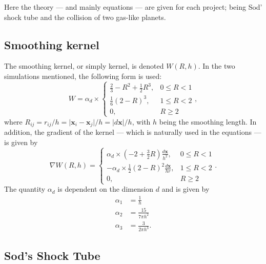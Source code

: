 \documentclass[12pt]{article}
\begin{document}
Here the theory --- and mainly equations --- are given for each project; being Sod' shock tube and the collision of two gas-like planets. 

\subsection{Smoothing kernel}

The smoothing kernel, or simply kernel, is denoted $W(R,h)$. In the two simulations mentioned, the following form is used:
\begin{equation}
	W = \alpha_d\times
	\begin{cases}
		\frac{2}{3} - R^2 + \frac{1}{2}R^3, & 0\leq R < 1\\
		\frac{1}{6}(2-R)^3, & 1 \leq R < 2\\
		0, & R\geq 2
	\end{cases},
\end{equation}
where $R_{ij} = r_{ij}/h = \vert\mathbf{x}_i - \mathbf{x}_j\vert/h = \vert d\mathbf{x}\vert/h$, with $h$ being the smoothing length. In addition, the gradient of the kernel --- which is naturally used in the equations --- is given by 
\begin{equation}
	\nabla W(R,h) = 
	\begin{cases}
		\alpha_d\times \left(-2 + \frac{3}{2}R\right)\frac{d\mathbf{x}}{h^2}, & 0 \leq R < 1\\
		-\alpha_d\times \frac{1}{2}(2-R)^2\frac{d\mathbf{x}}{hr}, & 1\leq R < 2\\
		0, & R\geq 2
	\end{cases}.
\end{equation}
The quantity $\alpha_d$ is dependent on the dimension $d$ and is given by 
\begin{align}
	\alpha_1 &= \frac{1}{h}\\
	\alpha_2 &= \frac{15}{7\pi h^2}\\
	\alpha_3 &= \frac{3}{2\pi h^3}.
\end{align}

\subsection{Sod's Shock Tube}
\end{document}
